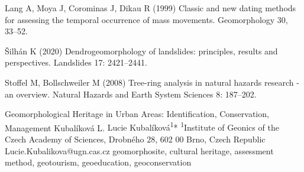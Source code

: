 {Lang A, Moya J, Corominas J, Dikau R (1999) Classic and new dating methods for assessing the temporal occurrence of mass movements. Geomorphology 30, 33–52.

Šilhán K (2020) Dendrogeomorphology of landslides: principles, results and perspectives. Landslides 17: 2421–2441. 

Stoffel M, Bollschweiler M (2008) Tree-ring analysis in natural hazards research - an overview. Natural Hazards and Earth System Sciences 8: 187–202.
}


\abstract
{Geomorphological Heritage in Urban Areas: Identification, Conservation, Management} 
{Kubalíková L.} 
{Lucie Kubalíková\textsuperscript{1}*} 
{\TLtag} 
{
\textsuperscript{1}Institute of Geonics of the Czech Academy of Sciences, Drobného 28, 602 00 Brno, Czech Republic
}
{Lucie.Kubalikova@ugn.cas.cz}  %
{geomorphosite, cultural heritage, assessment method, geotourism, geoeducation, geoconservation}
